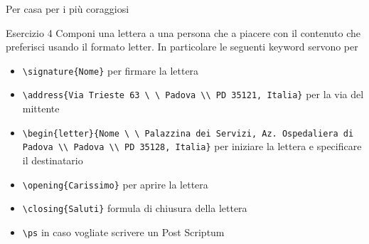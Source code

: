 \begin{frame}[fragile]{Per casa per i più coraggiosi}

\begin{block}{Esercizio 4}
	Componi una lettera a una persona che a piacere con il contenuto che
	preferisci usando il formato letter. In particolare le seguenti keyword
	servono per
	\begin{itemize}
    	\item \texttt{\textbackslash{}signature\{Nome\}} per firmare la lettera
    	\item \texttt{\textbackslash{}address\{Via Trieste 63 \textbackslash{}
    	\textbackslash{} Padova \textbackslash{}\textbackslash{} PD 35121,
    	Italia\}} per la via del mittente
    	\item \texttt{\textbackslash{}begin\{letter\}\{Nome \textbackslash{}
    	\textbackslash{} Palazzina dei Servizi, Az. Ospedaliera di Padova 
    	\textbackslash{}\textbackslash{} Padova \textbackslash{}\textbackslash{}
    	PD 35128, Italia\}} per iniziare la lettera e specificare il
    	destinatario
    	\item \texttt{\textbackslash{}opening\{Carissimo\}} per aprire la
    	lettera
    	\item \texttt{\textbackslash{}closing\{Saluti\}} formula di chiusura
    	della lettera
    	\item \texttt{\textbackslash{}ps} in caso vogliate scrivere un Post
    	Scriptum
    \end{itemize}
\end{block}

\end{frame}